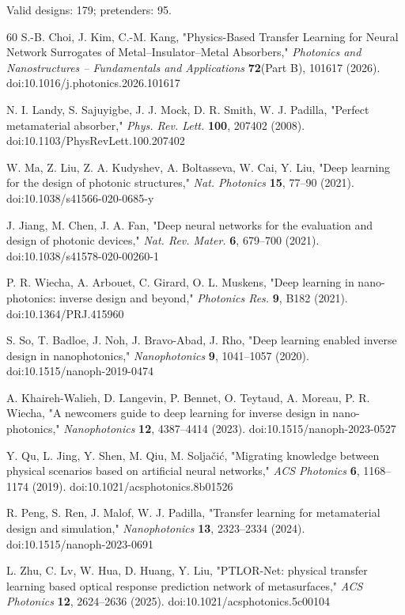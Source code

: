 \documentclass[11pt,a4paper]{article}
\begin{document}
Valid designs: 179; pretenders: 95.

\begin{thebibliography}{60}
S.-B. Choi, J. Kim, C.-M. Kang, "Physics-Based Transfer Learning for Neural Network Surrogates of Metal--Insulator--Metal Absorbers," \emph{Photonics and Nanostructures -- Fundamentals and Applications} \textbf{72}(Part B), 101617 (2026). doi:10.1016/j.photonics.2026.101617

N. I. Landy, S. Sajuyigbe, J. J. Mock, D. R. Smith, W. J. Padilla, "Perfect metamaterial absorber," \emph{Phys. Rev. Lett.} \textbf{100}, 207402 (2008). doi:10.1103/PhysRevLett.100.207402

W. Ma, Z. Liu, Z. A. Kudyshev, A. Boltasseva, W. Cai, Y. Liu, "Deep learning for the design of photonic structures," \emph{Nat. Photonics} \textbf{15}, 77--90 (2021). doi:10.1038/s41566-020-0685-y

J. Jiang, M. Chen, J. A. Fan, "Deep neural networks for the evaluation and design of photonic devices," \emph{Nat. Rev. Mater.} \textbf{6}, 679--700 (2021). doi:10.1038/s41578-020-00260-1

P. R. Wiecha, A. Arbouet, C. Girard, O. L. Muskens, "Deep learning in nano-photonics: inverse design and beyond," \emph{Photonics Res.} \textbf{9}, B182 (2021). doi:10.1364/PRJ.415960

S. So, T. Badloe, J. Noh, J. Bravo-Abad, J. Rho, "Deep learning enabled inverse design in nanophotonics," \emph{Nanophotonics} \textbf{9}, 1041--1057 (2020). doi:10.1515/nanoph-2019-0474

A. Khaireh-Walieh, D. Langevin, P. Bennet, O. Teytaud, A. Moreau, P. R. Wiecha, "A newcomer\textquotesingle s guide to deep learning for inverse design in nano-photonics," \emph{Nanophotonics} \textbf{12}, 4387--4414 (2023). doi:10.1515/nanoph-2023-0527

Y. Qu, L. Jing, Y. Shen, M. Qiu, M. Solja\v{c}i\'c, "Migrating knowledge between physical scenarios based on artificial neural networks," \emph{ACS Photonics} \textbf{6}, 1168--1174 (2019). doi:10.1021/acsphotonics.8b01526

R. Peng, S. Ren, J. Malof, W. J. Padilla, "Transfer learning for metamaterial design and simulation," \emph{Nanophotonics} \textbf{13}, 2323--2334 (2024). doi:10.1515/nanoph-2023-0691

L. Zhu, C. Lv, W. Hua, D. Huang, Y. Liu, "PTLOR-Net: physical transfer learning based optical response prediction network of metasurfaces," \emph{ACS Photonics} \textbf{12}, 2624--2636 (2025). doi:10.1021/acsphotonics.5c00104


\end{thebibliography}
\end{document}

